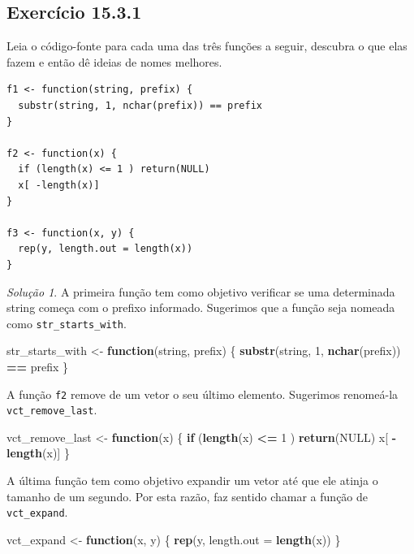 \documentclass[
]{latex/krantz}
\newenvironment{Shaded}{\begin{snugshade}}{\end{snugshade}}
\newcommand{\AttributeTok}[1]{\textcolor[rgb]{0.13,0.29,0.53}{#1}}
\newcommand{\ConstantTok}[1]{\textcolor[rgb]{0.56,0.35,0.01}{#1}}
\newcommand{\ControlFlowTok}[1]{\textcolor[rgb]{0.13,0.29,0.53}{\textbf{#1}}}
\newcommand{\DecValTok}[1]{\textcolor[rgb]{0.00,0.00,0.81}{#1}}
\newcommand{\FunctionTok}[1]{\textcolor[rgb]{0.13,0.29,0.53}{\textbf{#1}}}
\newcommand{\NormalTok}[1]{#1}
\newcommand{\OtherTok}[1]{\textcolor[rgb]{0.56,0.35,0.01}{#1}}
\newcommand{\SpecialCharTok}[1]{\textcolor[rgb]{0.81,0.36,0.00}{\textbf{#1}}}
\theoremstyle{definition}
\theoremstyle{definition}
\theoremstyle{definition}
\theoremstyle{definition}
\theoremstyle{remark}
\newtheorem*{solution}{Solução}
\begin{document}
\hypertarget{exr15-3-1}{%
\subsection*{Exercício 15.3.1}\label{exr15-3-1}}

Leia o código-fonte para cada uma das três funções a seguir, descubra o que elas fazem e então dê ideias de nomes melhores.

\begin{verbatim}
f1 <- function(string, prefix) {
  substr(string, 1, nchar(prefix)) == prefix
}

f2 <- function(x) {
  if (length(x) <= 1 ) return(NULL)
  x[ -length(x)]
}

f3 <- function(x, y) {
  rep(y, length.out = length(x))
}
\end{verbatim}

\begin{solution}

A primeira função tem como objetivo verificar se uma determinada string começa com o prefixo informado. Sugerimos que a função seja nomeada como \texttt{str\_starts\_with}.

\begin{Shaded}
\begin{Highlighting}[]
\NormalTok{str\_starts\_with }\OtherTok{\textless{}{-}} \ControlFlowTok{function}\NormalTok{(string, prefix) \{}
  \FunctionTok{substr}\NormalTok{(string, }\DecValTok{1}\NormalTok{, }\FunctionTok{nchar}\NormalTok{(prefix)) }\SpecialCharTok{==}\NormalTok{ prefix}
\NormalTok{\}}
\end{Highlighting}
\end{Shaded}

A função \texttt{f2} remove de um vetor o seu último elemento. Sugerimos renomeá-la \texttt{vct\_remove\_last}.

\begin{Shaded}
\begin{Highlighting}[]
\NormalTok{vct\_remove\_last }\OtherTok{\textless{}{-}} \ControlFlowTok{function}\NormalTok{(x) \{}
  \ControlFlowTok{if}\NormalTok{ (}\FunctionTok{length}\NormalTok{(x) }\SpecialCharTok{\textless{}=} \DecValTok{1}\NormalTok{ ) }\FunctionTok{return}\NormalTok{(}\ConstantTok{NULL}\NormalTok{)}
\NormalTok{  x[ }\SpecialCharTok{{-}}\FunctionTok{length}\NormalTok{(x)]}
\NormalTok{\}}
\end{Highlighting}
\end{Shaded}

A última função tem como objetivo expandir um vetor até que ele atinja o tamanho de um segundo. Por esta razão, faz sentido chamar a função de \texttt{vct\_expand}.

\begin{Shaded}
\begin{Highlighting}[]
\NormalTok{vct\_expand }\OtherTok{\textless{}{-}} \ControlFlowTok{function}\NormalTok{(x, y) \{}
  \FunctionTok{rep}\NormalTok{(y, }\AttributeTok{length.out =} \FunctionTok{length}\NormalTok{(x))}
\NormalTok{\}}
\end{Highlighting}
\end{Shaded}

\end{solution}
\end{document}
